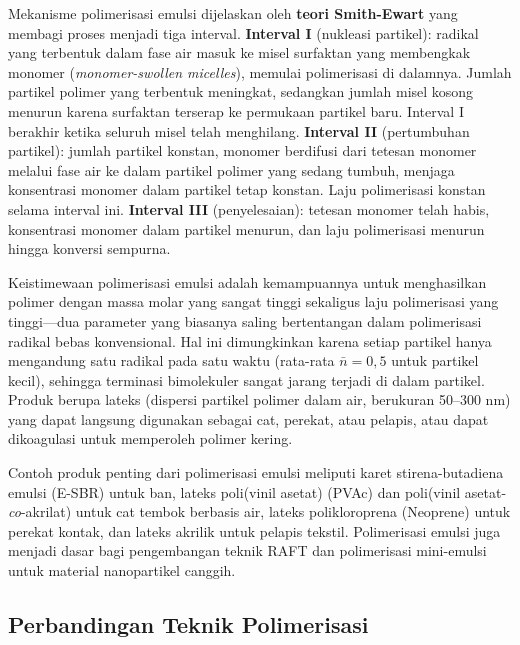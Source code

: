 \documentclass[12pt,a4paper,openany]{book}
\begin{document}
Mekanisme polimerisasi emulsi dijelaskan oleh \textbf{teori Smith-Ewart} yang membagi proses menjadi tiga interval. \textbf{Interval I} (nukleasi partikel): radikal yang terbentuk dalam fase air masuk ke misel surfaktan yang membengkak monomer (\textit{monomer-swollen micelles}), memulai polimerisasi di dalamnya. Jumlah partikel polimer yang terbentuk meningkat, sedangkan jumlah misel kosong menurun karena surfaktan terserap ke permukaan partikel baru. Interval I berakhir ketika seluruh misel telah menghilang. \textbf{Interval II} (pertumbuhan partikel): jumlah partikel konstan, monomer berdifusi dari tetesan monomer melalui fase air ke dalam partikel polimer yang sedang tumbuh, menjaga konsentrasi monomer dalam partikel tetap konstan. Laju polimerisasi konstan selama interval ini. \textbf{Interval III} (penyelesaian): tetesan monomer telah habis, konsentrasi monomer dalam partikel menurun, dan laju polimerisasi menurun hingga konversi sempurna.

Keistimewaan polimerisasi emulsi adalah kemampuannya untuk menghasilkan polimer dengan massa molar yang sangat tinggi sekaligus laju polimerisasi yang tinggi---dua parameter yang biasanya saling bertentangan dalam polimerisasi radikal bebas konvensional. Hal ini dimungkinkan karena setiap partikel hanya mengandung satu radikal pada satu waktu (rata-rata $\bar{n} = 0,5$ untuk partikel kecil), sehingga terminasi bimolekuler sangat jarang terjadi di dalam partikel. Produk berupa lateks (dispersi partikel polimer dalam air, berukuran 50--300 nm) yang dapat langsung digunakan sebagai cat, perekat, atau pelapis, atau dapat dikoagulasi untuk memperoleh polimer kering.

Contoh produk penting dari polimerisasi emulsi meliputi karet stirena-butadiena emulsi (E-SBR) untuk ban, lateks poli(vinil asetat) (PVAc) dan poli(vinil asetat-\textit{co}-akrilat) untuk cat tembok berbasis air, lateks polikloroprena (Neoprene) untuk perekat kontak, dan lateks akrilik untuk pelapis tekstil. Polimerisasi emulsi juga menjadi dasar bagi pengembangan teknik RAFT dan polimerisasi mini-emulsi untuk material nanopartikel canggih.

\subsection{Perbandingan Teknik Polimerisasi}
\end{document}
